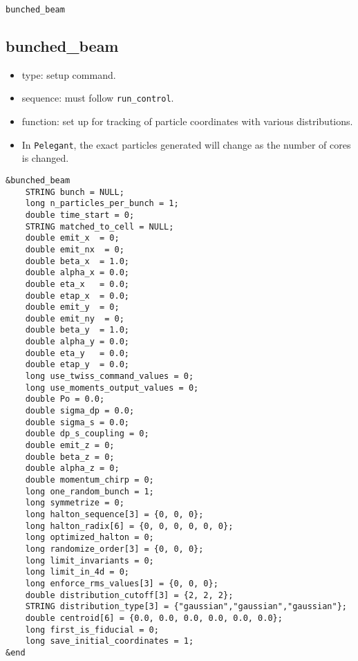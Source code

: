 \documentclass[11pt]{article}
\begin{document}
\newpage
\begin{center}{\Large\verb|bunched_beam|}\end{center}
\subsection{bunched\_beam \label{subsec:bunchedbeam}}

\begin{itemize}
\item type: setup command.
\item sequence: must follow \verb|run_control|.
\item function: set up for tracking of particle coordinates with various distributions.
\item In \verb|Pelegant|, the exact particles generated will change as the number of cores is changed.
\end{itemize}

\begin{verbatim}
&bunched_beam
    STRING bunch = NULL;
    long n_particles_per_bunch = 1;
    double time_start = 0;
    STRING matched_to_cell = NULL;
    double emit_x  = 0;
    double emit_nx  = 0;
    double beta_x  = 1.0;
    double alpha_x = 0.0;
    double eta_x   = 0.0;
    double etap_x  = 0.0;
    double emit_y  = 0;
    double emit_ny  = 0;
    double beta_y  = 1.0;
    double alpha_y = 0.0;
    double eta_y   = 0.0;
    double etap_y  = 0.0;
    long use_twiss_command_values = 0;
    long use_moments_output_values = 0;
    double Po = 0.0;
    double sigma_dp = 0.0;
    double sigma_s = 0.0;
    double dp_s_coupling = 0;
    double emit_z = 0;
    double beta_z = 0;
    double alpha_z = 0;
    double momentum_chirp = 0;
    long one_random_bunch = 1;
    long symmetrize = 0;
    long halton_sequence[3] = {0, 0, 0};
    long halton_radix[6] = {0, 0, 0, 0, 0, 0};
    long optimized_halton = 0;
    long randomize_order[3] = {0, 0, 0};
    long limit_invariants = 0;
    long limit_in_4d = 0;
    long enforce_rms_values[3] = {0, 0, 0};
    double distribution_cutoff[3] = {2, 2, 2};
    STRING distribution_type[3] = {"gaussian","gaussian","gaussian"};
    double centroid[6] = {0.0, 0.0, 0.0, 0.0, 0.0, 0.0};
    long first_is_fiducial = 0;
    long save_initial_coordinates = 1;
&end
\end{verbatim}
\end{document}
